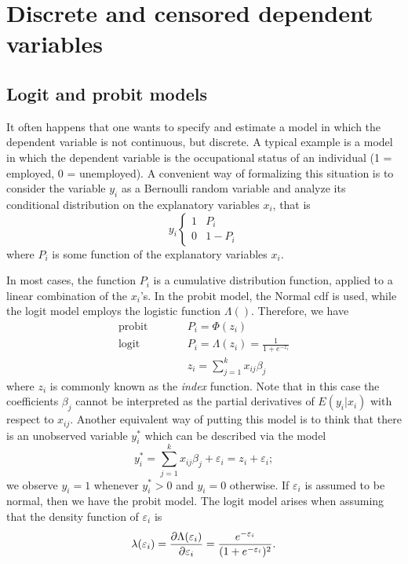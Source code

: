 \chapter{Discrete and censored dependent variables}
\label{discr-models}

\section{Logit and probit models}
\label{sec:logit-probit}

It often happens that one wants to specify and estimate a model in
which the dependent variable is not continuous, but discrete. A
typical example is a model in which the dependent variable is the
occupational status of an individual (1 = employed, 0 = unemployed). A
convenient way of formalizing this situation is to consider the
variable $y_i$ as a Bernoulli random variable and analyze its
conditional distribution on the explanatory variables $x_i$, that is
\begin{equation}
  \label{eq:qr-Bernoulli}
  y_i \left\{ 
    \begin{array}{ll} 1 & P_i \\ 0 & 1 - P_i \end{array}
    \right. 
\end{equation}
where $P_i$ is some function of the explanatory variables $x_i$.

In most cases, the function $P_i$ is a cumulative distribution
function, applied to a linear combination of the $x_i$'s. In the
probit model, the Normal cdf is used, while the logit model employs
the logistic function $\Lambda()$. Therefore, we have
\begin{eqnarray}
  \label{eq:qr-link}
  \textrm{probit} & \qquad & P_i = \Phi(z_i)  \\
  \textrm{logit}  & \qquad & P_i = \Lambda(z_i) = \frac{1}{1 + e^{-z_i}} \\
  & &z_i = \sum_{j=1}^k x_{ij} \beta_j
\end{eqnarray}
where $z_i$ is commonly known as the \emph{index} function. Note that
in this case the coefficients $\beta_j$ cannot be interpreted as the
partial derivatives of $E(y_i | x_i)$ with respect to $x_{ij}$. Another
equivalent way of putting this model is to think that there is an
unobserved variable $y^*_i$ which can be described via the model
\begin{equation}
  \label{eq:qr-latent}
  y^*_i = \sum_{j=1}^k x_{ij} \beta_j + \varepsilon_i = z_i  +
  \varepsilon_i ;
\end{equation}
we observe $y_i = 1$ whenever $y^*_i > 0$ and $y_i = 0$ otherwise. If
$\varepsilon_i$ is assumed to be normal, then we have the probit
model. The logit model arises when assuming that the density function of
$\varepsilon_i$ is 
\[
  \lambda(\varepsilon_i) =
  \frac{\partial \Lambda(\varepsilon_i)}{\partial \varepsilon_i} =
  \frac{e^{-\varepsilon_i}}{(1 + e^{-\varepsilon_i})^2} .
\]

